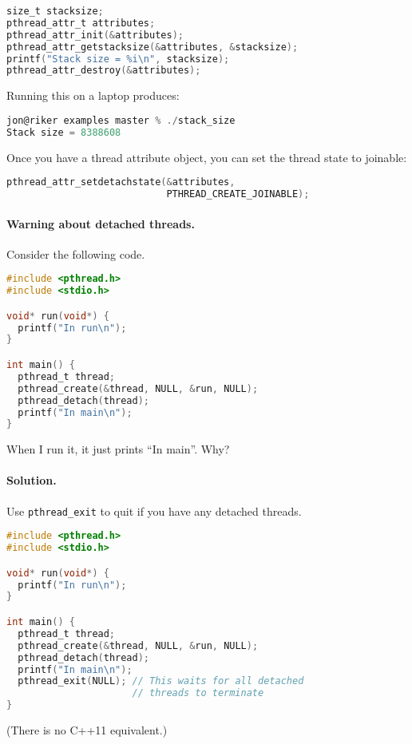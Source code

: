   \begin{lstlisting}[language=C]
size_t stacksize;
pthread_attr_t attributes;
pthread_attr_init(&attributes);
pthread_attr_getstacksize(&attributes, &stacksize);
printf("Stack size = %i\n", stacksize);
pthread_attr_destroy(&attributes);
  \end{lstlisting}

Running this on a laptop produces:

  \begin{lstlisting}[language=C]
jon@riker examples master % ./stack_size 
Stack size = 8388608
  \end{lstlisting}

Once you have a thread attribute object, you can set the thread state to joinable:
  \begin{lstlisting}[language=C]
pthread_attr_setdetachstate(&attributes,
                            PTHREAD_CREATE_JOINABLE);
  \end{lstlisting}

\paragraph{Warning about detached threads.} Consider the following code.

\begin{lstlisting}[language=C]
#include <pthread.h>
#include <stdio.h>

void* run(void*) {
  printf("In run\n");
}

int main() {
  pthread_t thread;
  pthread_create(&thread, NULL, &run, NULL);
  pthread_detach(thread);
  printf("In main\n");
}
\end{lstlisting}

  When I run it, it just prints ``In main''. Why?

\paragraph{Solution.} Use {\tt pthread\_exit} to quit if you have any detached threads.
  \begin{lstlisting}[language=C]
#include <pthread.h>
#include <stdio.h>

void* run(void*) {
  printf("In run\n");
}

int main() {
  pthread_t thread;
  pthread_create(&thread, NULL, &run, NULL);
  pthread_detach(thread);
  printf("In main\n");
  pthread_exit(NULL); // This waits for all detached
                      // threads to terminate
}
  \end{lstlisting}
(There is no C++11 equivalent.)

